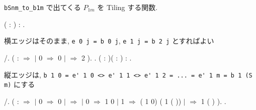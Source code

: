 \documentclass[12pt]{report}
\begin{document}
\verb|bSnm_to_b1m| で出てくる $P_{1m}$ を Tiling する関数.
 \begin{coqdoccode}
\coqdocemptyline
\coqdocnoindent
{}  ( : ) : .\coqdoceol
\end{coqdoccode}
 横エッジはそのまま, \verb|e 0 j = b 0 j|, \verb|e 1 j = b 2 j| とすればよい  \begin{coqdoccode}
\coqdocemptyline
\coqdocnoindent
{} /.\coqdoceol
\coqdocnoindent
{} (   :  \ensuremath{\Rightarrow}\coqdoceol
\coqdocnoindent
{}  \coqdoceol
\coqdocindent{1.00em}
\ensuremath{|} 0 \ensuremath{\Rightarrow}  0 \coqdoceol
\coqdocindent{1.00em}
\ensuremath{|} \coqdocvar{\_} \ensuremath{\Rightarrow}  2 \coqdoceol
\coqdocnoindent
{}).\coqdoceol
\coqdocnoindent
{}.\coqdoceol
\coqdocemptyline
\coqdocnoindent
{}  ( : )( : ) : .\coqdoceol
\end{coqdoccode}
 縦エッジは, \verb|b 1 0 = e' 1 0 <> e' 1 1 <> e' 1 2 = ... = e' 1 m = b 1 (S m)| にする  \begin{coqdoccode}
\coqdocemptyline
\coqdocnoindent
{} /.\coqdoceol
\coqdocnoindent
{} (   :  \ensuremath{\Rightarrow}\coqdoceol
\coqdocnoindent
{}  \coqdoceol
\coqdocindent{1.00em}
\ensuremath{|} 0 \ensuremath{\Rightarrow} 0\coqdoceol
\coqdocindent{1.00em}
\ensuremath{|} \coqdocvar{\_} \ensuremath{\Rightarrow}   \coqdoceol
\coqdocindent{5.50em}
\ensuremath{|} 0 \ensuremath{\Rightarrow}  1 0\coqdoceol
\coqdocindent{5.50em}
\ensuremath{|} 1 \ensuremath{\Rightarrow}  ( 1 0) ( 1 ( ))\coqdoceol
\coqdocindent{5.50em}
\ensuremath{|} \coqdocvar{\_} \ensuremath{\Rightarrow}  1 ( )\coqdoceol
\coqdocindent{4.50em}
\coqdoceol
\coqdocnoindent
{}).\coqdoceol
\coqdocnoindent
{}.\coqdoceol
\coqdocemptyline
\end{coqdoccode}
\end{document}
